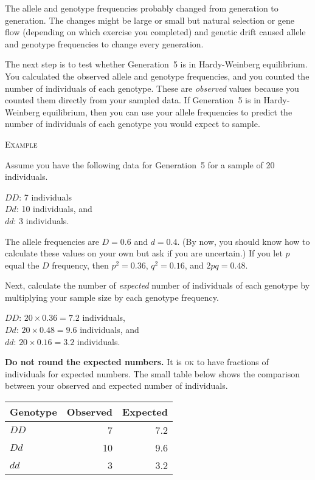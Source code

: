 \documentclass[12pt, hidelinks]{exam}
\begin{document}
\begin{questions}
\label{sec:chi_square}The allele and genotype frequencies probably changed from generation to 
generation. The changes might be large or small but natural selection or gene flow (depending on which exercise you completed) and genetic drift caused allele 
and genotype frequencies to change every generation.

The next step is to test whether Generation~5 is in Hardy-Weinberg equilibrium. 
You calculated the observed allele and genotype frequencies, and you counted the 
number of individuals of each genotype. These are \emph{observed} values because 
you counted them directly from your sampled data.  If Generation~5 is in 
Hardy-Weinberg equilibrium, then you can use your allele frequencies to predict 
the number of individuals of each genotype you would expect to sample. \bigskip

\textsc{Example}

\medskip

Assume you have the following data for Generation~5 for a sample of 20 individuals.

$DD$: 7 individuals  \\
$Dd$: 10 individuals, and\\
$dd$: 3 individuals.

The allele frequencies are $D = 0.6$ and $d = 0.4$. (By now, you should 
know how to calculate these values on your own but ask if you are uncertain.) If you let $p$ equal the $D$ 
frequency, then $p^2 = 0.36$, $q^2 = 0.16$, and $2pq = 0.48$.

Next, calculate the number of \emph{expected} number of individuals of each 
genotype by multiplying your sample size by each genotype frequency.

$DD$: $20 \times 0.36 = 7.2$ individuals,\\
$Dd$: $20 \times 0.48 = 9.6$ individuals, and\\
$dd$: $20 \times 0.16 = 3.2$ individuals.

\textbf{Do not round the expected numbers.} It is \textsc{ok} to have 
fractions of individuals for expected numbers. The small table below 
shows the comparison between your observed and expected number of individuals.

\begin{longtable}{lrr}
	\toprule
	Genotype	& Observed	& Expected \tabularnewline
	\midrule
	$DD$ & 7  & 7.2 \tabularnewline
	$Dd$ & 10 & 9.6 \tabularnewline
	$dd$ & 3  & 3.2 \tabularnewline
	\bottomrule
\end{longtable}	


\end{questions}
\end{document}
